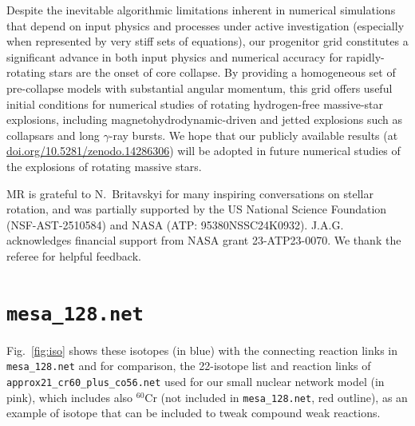 \documentclass[%
trackchanges,twocolumn]{aastex701}
\begin{document}
Despite the inevitable algorithmic limitations inherent in numerical
simulations that depend on input physics and processes under active
investigation (especially when represented by very stiff sets of
equations), our progenitor grid constitutes a significant advance in
both input physics and numerical accuracy for rapidly-rotating stars
are the onset of core collapse. By providing a homogeneous set of
pre-collapse models with substantial angular momentum, this grid
offers useful initial conditions for numerical studies of rotating
hydrogen-free massive-star explosions, including
magnetohydrodynamic-driven and jetted explosions such as collapsars
and long $\gamma$-ray bursts. We hope that our publicly available
results (at
\href{https://doi.org/10.5281/zenodo.14286306}{doi.org/10.5281/zenodo.14286306})
will be adopted in future numerical studies of the explosions
of rotating massive stars.\\




\begin{acknowledgements}
  MR is grateful to N.~Britavskyi for many inspiring conversations on
  stellar rotation, and was partially supported by the US National
  Science Foundation (NSF-AST-2510584) and NASA (ATP: 95380NSSC24K0932).
  J.A.G. acknowledges financial support from NASA grant 23-ATP23-0070.
  We thank the referee for helpful feedback.
\end{acknowledgements}





\appendix
\twocolumngrid
\section{\texttt{mesa\_128.net}}
\label{sec:mesa128}

Fig.~\ref{fig:iso} shows these isotopes (in blue) with the connecting
reaction links in \texttt{mesa\_128.net} and for comparison, the
22-isotope list and reaction links of
\texttt{approx21\_cr60\_plus\_co56.net} used for our small nuclear
network model (in pink), which includes also $^{60}\mathrm{Cr}$ (not
included in \texttt{mesa\_128.net}, red outline), as an example of
isotope that can be included to tweak compound weak reactions.
\end{document}
